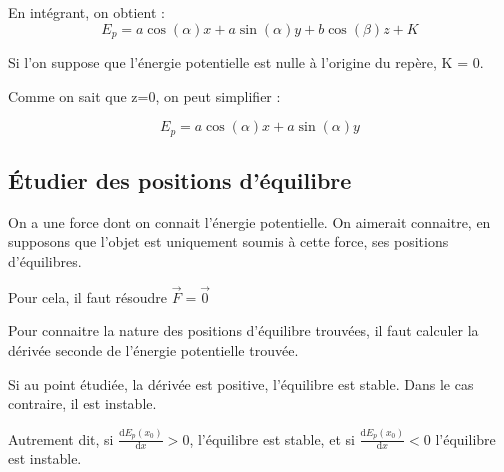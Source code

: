 \documentclass[french]{yLectureNote}
\renewcommand{\vec}{\overrightarrow}
\newcommand{\dd}[0]{\mathrm{d}}
\begin{document}
En intégrant, on obtient :
\[E_p = a \cos(\alpha)x + a\sin(\alpha)y + b\cos(\beta)z + K\]

Si l'on suppose que l'énergie potentielle est nulle à l'origine du repère, K = 0.

Comme on sait que z=0, on peut simplifier :

\[E_p = a \cos(\alpha)x + a\sin(\alpha)y\]
\subsection{Étudier des positions d'équilibre}
On a une force dont on connait l'énergie potentielle. On aimerait connaitre, en supposons que l'objet est uniquement soumis à cette force, ses positions d'équilibres.

Pour cela, il faut résoudre \(\vec{F} = \vec{0}\)

Pour connaitre la nature des positions d'équilibre trouvées, il faut calculer la dérivée seconde de l'énergie potentielle trouvée.

Si au point étudiée, la dérivée est positive, l'équilibre est stable. Dans le cas contraire, il est instable.

Autrement dit, si \(\frac{\dd E_p(x_0)}{\dd x} >0\), l'équilibre est stable, et si \(\frac{\dd E_p(x_0)}{\dd x} <0\) l'équilibre est instable.
\end{document}
